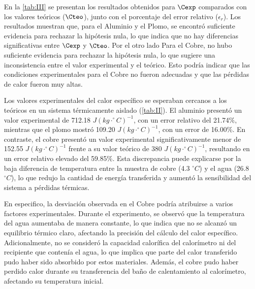 \documentclass[12pt,a4paper]{config/myConfig}
\begin{document}
En la \cref{tab:III} se presentan los resultados obtenidos para $\Cexp$ comparados con los valores teóricos ($\Cteo$), junto con el porcentaje del error relativo ($\epsilon_r$). Los resultados muestran que, para el Aluminio y el Plomo, se encontró suficiente evidencia para rechazar la hipótesis nula, lo que indica que no hay diferencias significativas entre $\Cexp$ y $\Cteo$. Por el otro lado Para el Cobre, no hubo suficiente evidencia para rechazar la hipótesis nula, lo que sugiere una inconsistencia entre el valor experimental y el teórico. Esto podría indicar que las condiciones experimentales para el Cobre no fueron adecuadas y que las pérdidas de calor fueron muy altas.\newline

Los valores experimentales del calor específico se esperaban cercanos a los teóricos en un sistema térmicamente aislado (\cref{tab:II}). El aluminio presentó un valor experimental de 712.18 $J (kg \cdot ^\circ C)^{-1}$, con un error relativo del 21.74\%, mientras que el plomo mostró 109.20 $J (kg \cdot ^\circ C)^{-1}$, con un error de 16.00\%. En contraste, el cobre presentó un valor experimental significativamente menor de 152.55 $J (kg \cdot ^\circ C)^{-1}$ frente a su valor teórico de 380 $J (kg \cdot ^\circ C)^{-1}$, resultando en un error relativo elevado del 59.85\%. Esta discrepancia puede explicarse por la baja diferencia de temperatura entre la muestra de cobre (4.3 $^\circ C$) y el agua (26.8 $^\circ C$), lo que redujo la cantidad de energía transferida y aumentó la sensibilidad del sistema a pérdidas térmicas. \newline

En especifico, la desviación observada en el Cobre podría atribuirse a varios factores experimentales. Durante el experimento, se observó que la temperatura del agua aumentaba de manera constante, lo que indica que no se alcanzó un equilibrio térmico claro, afectando la precisión del cálculo del calor específico. Adicionalmente, no se consideró la capacidad calorífica del calorímetro ni del recipiente que contenía el agua, lo que implica que parte del calor transferido pudo haber sido absorbido por estos materiales. Además, el cobre pudo haber perdido calor durante su transferencia del baño de calentamiento al calorímetro, afectando su temperatura inicial. \newline



\end{document}
